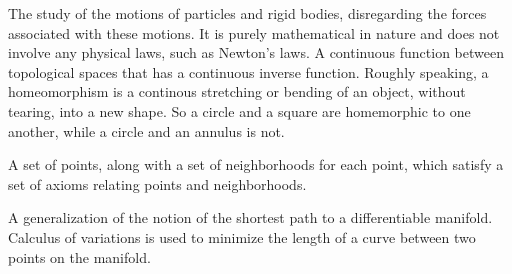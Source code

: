 
{
    The study of the motions of particles and rigid bodies, disregarding the forces associated with these motions.
    It is purely mathematical in nature and does not involve any physical laws, such as Newton's laws.
}
{
   A continuous function between topological spaces that has a continuous inverse function.
   Roughly speaking, a homeomorphism is a continous stretching or bending of an object, without tearing, into a new shape. 
   So a circle and a square are homemorphic to one another, while a circle and an annulus is not.
}

{
    A set of points, along with a set of neighborhoods for each point, which satisfy a set of axioms relating points and neighborhoods.
}

{
    A generalization of the notion of the shortest path to a differentiable manifold. 
    Calculus of variations is used to minimize the length of a curve between two points on the manifold.
}
